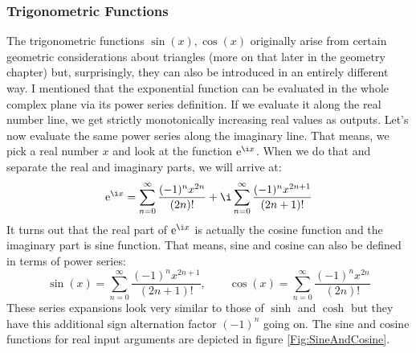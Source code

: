 









\subsubsection{Trigonometric Functions}
The trigonometric functions $\sin(x), \cos(x)$ originally arise from certain geometric considerations about triangles (more on that later in the geometry chapter) but, surprisingly, they can also be introduced in an entirely different way. I mentioned that the exponential function can be evaluated in the whole complex plane via its power series definition. If we evaluate it along the real number line, we get strictly monotonically increasing real values as outputs. Let's now evaluate the same power series along the imaginary line. That means, we pick a real number $x$ and look at the function $\e^{\i x}$. When we do that and separate the real and imaginary parts, we will arrive at:
\begin{equation}
\e^{\i x} =      \sum_{n=0}^{\infty} \frac{(-1)^n x^{2n}  }{(2n)!} 
            + \i \sum_{n=0}^{\infty} \frac{(-1)^n x^{2n+1}}{(2n+1)!}
\end{equation}
It turns out that the real part of $\e^{\i x}$ is actually the cosine function and the imaginary part is sine function. That means, sine and cosine can also be defined in terms of power series:
\begin{equation}
\sin(x) = \sum_{n=0}^{\infty} \frac{(-1)^n x^{2n+1}}{(2n+1)!}, \qquad
\cos(x) = \sum_{n=0}^{\infty} \frac{(-1)^n x^{2n}  }{(2n)!}
\end{equation}
These series expansions look very similar to those of $\sinh$ and $\cosh$ but they have this additional sign alternation factor $(-1)^n$ going on. The sine and cosine functions for real input arguments are depicted in figure \ref{Fig:SineAndCosine}.
